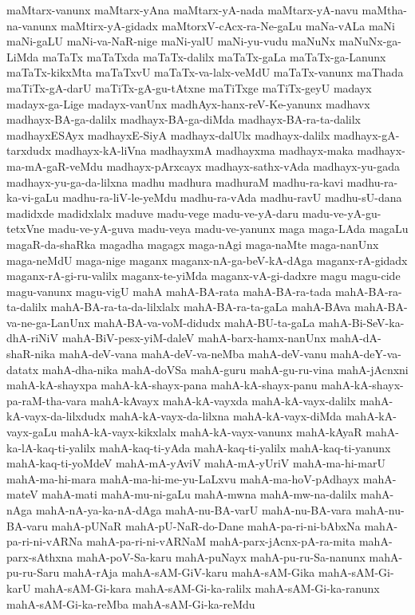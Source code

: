 {maMtarx-vanunx
maMtarx-yAna
maMtarx-yA-nada
maMtarx-yA-navu
maMtha-na-vanunx
maMtirx-yA-gidadx
maMtorxV-cAcx-ra-Ne-gaLu
maNa-vALa
maNi
maNi-gaLU
maNi-va-NaR-nige
maNi-yalU
maNi-yu-vudu
maNuNx
maNuNx-ga-LiMda
maTaTx
maTaTxda
maTaTx-dalilx
maTaTx-gaLa
maTaTx-ga-Lanunx
maTaTx-kikxMta
maTaTxvU
maTaTx-va-lalx-veMdU
maTaTx-vanunx
maThada
maTiTx-gA-darU
maTiTx-gA-gu-tAtxne
maTiTxge
maTiTx-geyU
madayx
madayx-ga-Lige
madayx-vanUnx
madhAyx-hanx-reV-Ke-yanunx
madhavx
madhayx-BA-ga-dalilx
madhayx-BA-ga-diMda
madhayx-BA-ra-ta-dalilx
madhayxESAyx
madhayxE-SiyA
madhayx-dalUlx
madhayx-dalilx
madhayx-gA-tarxdudx
madhayx-kA-liVna
madhayxmA
madhayxma
madhayx-maka
madhayx-ma-mA-gaR-veMdu
madhayx-pArxcayx
madhayx-sathx-vAda
madhayx-yu-gada
madhayx-yu-ga-da-lilxna
madhu
madhura
madhuraM
madhu-ra-kavi
madhu-ra-ka-vi-gaLu
madhu-ra-liV-le-yeMdu
madhu-ra-vAda
madhu-ravU
madhu-sU-dana
madidxde
madidxlalx
maduve
madu-vege
madu-ve-yA-daru
madu-ve-yA-gu-tetxVne
madu-ve-yA-guva
madu-veya
madu-ve-yanunx
maga
maga-LAda
magaLu
magaR-da-shaRka
magadha
magagx
maga-nAgi
maga-naMte
maga-nanUnx
maga-neMdU
maga-nige
maganx
maganx-nA-ga-beV-kA-dAga
maganx-rA-gidadx
maganx-rA-gi-ru-valilx
maganx-te-yiMda
maganx-vA-gi-dadxre
magu
magu-cide
magu-vanunx
magu-vigU
mahA
mahA-BA-rata
mahA-BA-ra-tada
mahA-BA-ra-ta-dalilx
mahA-BA-ra-ta-da-lilxlalx
mahA-BA-ra-ta-gaLa
mahA-BAva
mahA-BA-va-ne-ga-LanUnx
mahA-BA-va-voM-didudx
mahA-BU-ta-gaLa
mahA-Bi-SeV-ka-dhA-riNiV
mahA-BiV-pesx-yiM-daleV
mahA-barx-hamx-nanUnx
mahA-dA-shaR-nika
mahA-deV-vana
mahA-deV-va-neMba
mahA-deV-vanu
mahA-deY-va-datatx
mahA-dha-nika
mahA-doVSa
mahA-guru
mahA-gu-ru-vina
mahA-jAcnxni
mahA-kA-shayxpa
mahA-kA-shayx-pana
mahA-kA-shayx-panu
mahA-kA-shayx-pa-raM-tha-vara
mahA-kAvayx
mahA-kA-vayxda
mahA-kA-vayx-dalilx
mahA-kA-vayx-da-lilxdudx
mahA-kA-vayx-da-lilxna
mahA-kA-vayx-diMda
mahA-kA-vayx-gaLu
mahA-kA-vayx-kikxlalx
mahA-kA-vayx-vanunx
mahA-kAyaR
mahA-ka-lA-kaq-ti-yalilx
mahA-kaq-ti-yAda
mahA-kaq-ti-yalilx
mahA-kaq-ti-yanunx
mahA-kaq-ti-yoMdeV
mahA-mA-yAviV
mahA-mA-yUriV
mahA-ma-hi-marU
mahA-ma-hi-mara
mahA-ma-hi-me-yu-LaLxvu
mahA-ma-hoV-pAdhayx
mahA-mateV
mahA-mati
mahA-mu-ni-gaLu
mahA-mwna
mahA-mw-na-dalilx
mahA-nAga
mahA-nA-ya-ka-nA-dAga
mahA-nu-BA-varU
mahA-nu-BA-vara
mahA-nu-BA-varu
mahA-pUNaR
mahA-pU-NaR-do-Dane
mahA-pa-ri-ni-bAbxNa
mahA-pa-ri-ni-vARNa
mahA-pa-ri-ni-vARNaM
mahA-parx-jAcnx-pA-ra-mita
mahA-parx-sAthxna
mahA-poV-Sa-karu
mahA-puNayx
mahA-pu-ru-Sa-nanunx
mahA-pu-ru-Saru
mahA-rAja
mahA-sAM-GiV-karu
mahA-sAM-Gika
mahA-sAM-Gi-karU
mahA-sAM-Gi-kara
mahA-sAM-Gi-ka-ralilx
mahA-sAM-Gi-ka-ranunx
mahA-sAM-Gi-ka-reMba
mahA-sAM-Gi-ka-reMdu
}
